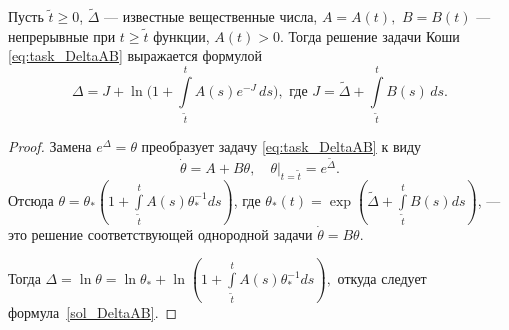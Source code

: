 \begin{lemma}\label{lm:DeltaAB}
Пусть $\tilde{t} \geqslant 0$, $\tilde{\Delta}$ --- известные вещественные числа, $A = A(t),$ $B = B(t)$ --- непрерывные при $t \geq \tilde{t}$ функции, $A(t) > 0$. Тогда решение задачи Коши \eqref{eq:task_DeltaAB} выражается формулой
	\begin{equation}\label{sol_DeltaAB}
	\Delta = J + \ln\Big(1 + \int\limits_{\tilde{t}}^{t} A(s) e^{-J}\,ds \Big),
	\text{ где } J = \tilde{\Delta} + \int\limits_{\tilde{t}}^{t} B(s)\,ds.
	\end{equation}
\end{lemma}
\begin{proof}
    Замена $e^{\Delta}=\theta$ преобразует задачу \eqref{eq:task_DeltaAB} к виду
    \begin{equation}\label{task_theta}
		\dot{\theta}=A+B\theta,\quad\theta|_{t=\tilde{t}}=e^{\tilde{\Delta}}.
    \end{equation}
	Отсюда $\theta=\theta_*(1+\int\limits_{\tilde{t}}^{t}A(s)\theta_*^{-1}ds)$, где $\theta_*(t)=\exp(\tilde{\Delta}+\int\limits_{\tilde{t}}^{t}B(s)ds)$, --- это решение соответствующей однородной задачи $\dot{\theta}=B\theta$.
    
    Тогда $\Delta=\ln\theta=\ln\theta_*+\ln(1+\int\limits_{\tilde{t}}^{t}A(s)\theta_*^{-1}ds),$ откуда следует формула~\eqref{sol_DeltaAB}.
\end{proof}

